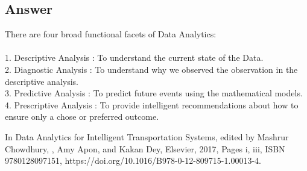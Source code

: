 \documentclass{article}
\begin{document}
\subsection{Answer}
There are four broad functional facets of Data Analytics:
\\
\\1. Descriptive Analysis : To understand the current state of the Data.
\\2. Diagnostic Analysis : To understand why we observed the observation in the descriptive analysis.
\\3. Predictive Analysis : To predict future events using the mathematical models.
\\4. Prescriptive Analysis : To provide intelligent recommendations about how to ensure only a chose or preferred outcome.

\begin{thebibliography}{99}
 In Data Analytics for Intelligent Transportation Systems, edited by Mashrur Chowdhury, , Amy Apon, and Kakan Dey, Elsevier, 2017, Pages i, iii, ISBN 9780128097151, https://doi.org/10.1016/B978-0-12-809715-1.00013-4. 
\end{thebibliography}
\end{document}
